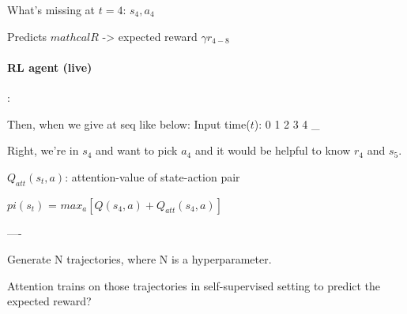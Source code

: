 \documentclass[11pt]{article}
\begin{document}
What's missing at $t=4$: $s_4, a_4$

Predicts $mathcal{R}$  -> expected reward $\gamma r_{4-8}$


\paragraph*{RL agent (live)}:

Then, when we give at seq like below:
Input time($t$): 0 1 2 3 4 \_

Right, we're in $s_4$ and want to pick $a_4$ and it would be helpful to know $r_4$ and $s_5$. 

$Q_{att}(s_t, a)$: attention-value of state-action pair

$pi(s_t)$ = $max_a [Q(s_4, a) + Q_{att}(s_4, a)]$ 

----

Generate N trajectories, where N is a hyperparameter. 

Attention trains on those trajectories in self-supervised setting to predict the expected reward?
\end{document}
